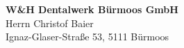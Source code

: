 \textbf{W\&H Dentalwerk Bürmoos GmbH}\\
Herrn Christof Baier\\
Ignaz-Glaser-Straße 53, 5111 Bürmoos

